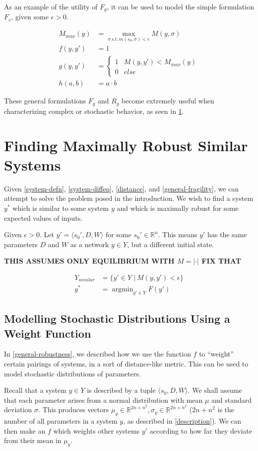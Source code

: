 \documentclass{article}
\DeclareMathOperator*{\argmin}{argmin}
\begin{document}
As an example of the utility of $F_g$, it can be used to model the simple formulation $F_s$, given some $\epsilon > 0$.

\begin{align}
  M_{max}(y) &= \max\limits_{\sigma \,s.t.\, m(s_0, \sigma) < \epsilon} M(y, \sigma) \\
  f(y, y') &= 1 \\
  g(y, y') &= \begin{cases}
    1 & M(y, y') < M_{max}(y) \\
    0 & else
  \end{cases} \\
  h(a, b) &= a \cdot b
\end{align}

These general formulations $F_g$ and $R_g$ become extremely useful when characterizing complex or stochastic behavior, as seen in \ref{max-robust}.

\section{Finding Maximally Robust Similar Systems} \label{max-robust}
Given \eqref{system-defn}, \eqref{system-diffeq}, \eqref{distance}, and \eqref{general-fragility}, we can attempt to solve the problem posed in the introduction. We wish to find a system $y^*$ which is similar to some system $y$ and which is maximally robust for some expected values of inputs.

Given $\epsilon > 0$. Let $y' = \langle s_0', D, W \rangle$ for some $s_0' \in \mathbb{R}^n$. This means $y'$ has the same parameters $D$ and $W$ as a network $y \in Y$, but a different initial state.

\textbf{THIS ASSUMES ONLY EQUILIBRIUM WITH $M = \lvert \cdot \rvert$ FIX THAT}

\begin{align}
  Y_{similar} &= \{y' \in Y \,\,|\, M(y, y') < \epsilon \} \\
  y^* &= \argmin_{y' \in Y} F(y')
\end{align}

\subsection{Modelling Stochastic Distributions Using a Weight Function}
In \ref{general-robustness}, we described how we use the function $f$ to ``weight'' certain pairings of systems, in a sort of distance-like metric. This can be used to model stochastic distributions of parameters.

Recall that a system $y \in Y$ is described by a tuple $\langle s_0, D, W \rangle$. We shall assume that each parameter arises from a normal distribution with mean $\mu$ and standard deviation $\sigma$. This produces vectors $\mu_y \in \mathbb{R}^{2n + n^2}, \sigma_y \in \mathbb{R}^{2n + n^2}$ ($2n + n^2$ is the number of all parameters in a system $y$, as described in \ref{description}). We can then make an $f$ which weights other systems $y'$ according to how far they deviate from their mean in $\mu_y$.
\end{document}
